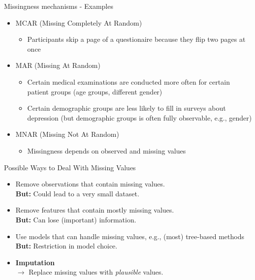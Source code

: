 \documentclass[11pt,compress,t,notes=noshow, xcolor=table]{beamer}
\begin{document}
\begin{frame}{Missingness mechanisms - Examples}
    \vfill
    \begin{itemize}
        \item MCAR (Missing Completely At Random)
        \begin{itemize}
            \item Participants skip a page of a questionaire because they flip two pages at once
        \end{itemize}
        \item MAR (Missing At Random)
        \begin{itemize}
            \item Certain medical examinations are conducted more often for certain patient groups (age groups, different gender)
            \item Certain demographic groups are less likely to fill in surveys about depression (but demographic groups is often fully observable, e.g., gender)
        \end{itemize}
        \item MNAR (Missing Not At Random)
        \begin{itemize}
            \item Missingness depends on observed and missing values
        \end{itemize}
    \end{itemize}    
    \vfill
\end{frame}
\begin{frame}{Possible Ways to Deal With Missing Values}

    \begin{itemize}
        \item Remove observations that contain missing values. \\
              \textbf{But:} Could lead to a very small dataset.
        
        \item Remove features that contain mostly missing values. \\
              \textbf{But:} Can lose (important) information.
        
        \item Use models that can handle missing values, e.g., (most) tree-based methods \\
              \textbf{But:} Restriction in model choice.
        
        \item \textbf{Imputation} \\
              $\rightarrow$ Replace missing values with \textit{plausible} values.
    \end{itemize}

\end{frame}
\end{document}
